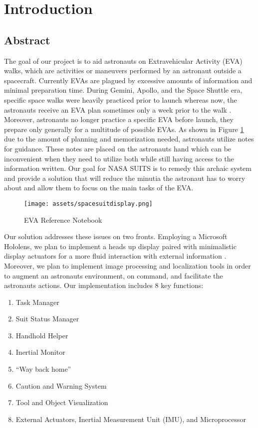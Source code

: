 \documentclass{article}
\let\Oldsection\section
\renewcommand{\section}{\FloatBarrier\Oldsection}
\let\Oldsubsection\subsection
\renewcommand{\subsection}{\FloatBarrier\Oldsubsection}
\begin{document}
\newpage

\section{Introduction}

\subsection{Abstract}

The goal of our project is to aid astronauts on Extravehicular Activity (EVA) walks, which are activities or maneuvers performed by an astronaut outside a spacecraft. Currently EVAs are plagued by excessive amounts of information and minimal preparation time. During Gemini, Apollo, and the Space Shuttle era, specific space walks were heavily practiced prior to launch whereas now, the astronauts receive an EVA plan sometimes only a week prior to the walk \autocite{mannedspaceflight}. Moreover, astronauts no longer practice a specific EVA before launch, they prepare only generally for a multitude of possible EVAs. As shown in Figure \ref{fig:spacesuitdisplay} due to the amount of planning and memorization needed, astronauts utilize notes for guidance. These notes are placed on the astronauts hand which can be inconvenient when they need to utilize both while still having access to the information written. Our goal for NASA SUITS is to remedy this archaic system and provide a solution that will reduce the minutia the astronaut has to worry about and allow them to focus on the main tasks of the EVA.

\begin{figure}[!htb]
  \centering
  \texttt{[image: assets/spacesuitdisplay.png]}
  \caption{EVA Reference Notebook}
  \label{fig:spacesuitdisplay}
\end{figure}

Our solution addresses these issues on two fronts. Employing a Microsoft Hololens, we plan to implement a heads up display paired with minimalistic display actuators for a more fluid interaction with external information \autocite{mrbasics}. Moreover, we plan to implement image processing and localization tools in order to augment an astronauts environment, on command, and facilitate the astronauts actions. Our implementation includes 8 key functions:

\begin{enumerate}
\item Task Manager
\item Suit Status Manager
\item Handhold Helper
\item Inertial Monitor
\item “Way back home”
\item Caution and Warning System
\item Tool and Object Visualization
\item External Actuators, Inertial Measurement Unit (IMU), and Microprocessor
\end{enumerate}
\end{document}
